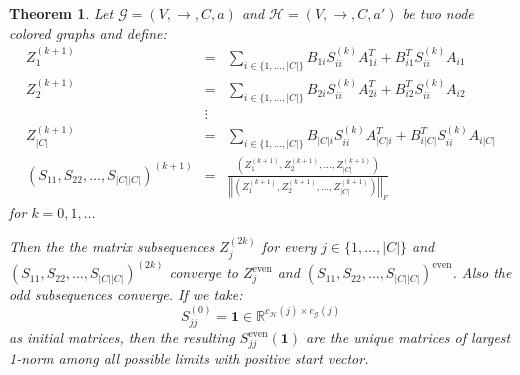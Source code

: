 \documentclass[a4paper,11pt]{report}
\newtheorem{theorem}{Theorem}[section]
\newcommand{\R}{{\mathbb R}}
\newcommand{\graf}{\mathscr{G}}
\newcommand{\grafeen}{\mathscr{H}}
\begin{document}
\begin{theorem}
  Let $\graf=(V,\to, C, a)$ and $\grafeen=(V,\to, C, a')$ be two node colored graphs and define:
  \begin{eqnarray*}
  Z^{(k+1)}_1 &=& \sum_{i \in \{1,\ldots, |C|\}}B_{1i}S^{(k)}_{ii}A^T_{1i} + B^T_{i1}S^{(k)}_{ii}A_{i1}\\
  Z^{(k+1)}_2 &=& \sum_{i \in \{1,\ldots, |C|\}}B_{2i}S^{(k)}_{ii}A^T_{2i} + B^T_{i2}S^{(k)}_{ii}A_{i2} \\
  &\vdots& \\
    Z^{(k+1)}_{|C|} &=& \sum_{i \in \{1,\ldots, |C|\}}B_{|C|i}S^{(k)}_{ii}A^T_{|C|i} + B^T_{i|C|}S^{(k)}_{ii}A_{i|C|} \\
 (S_{11}, S_{22},\ldots, S_{|C| |C|} )^{(k+1)} &=& \frac{\left(Z^{(k+1)}_1, Z^{(k+1)}_2, \ldots,Z^{(k+1)}_{|C|}\right)}{\left|\left|\left(Z^{(k+1)}_1, Z^{(k+1)}_2, \ldots,Z^{(k+1)}_{|C|}\right)\right|\right|_F}
  \end{eqnarray*}
 for $k = 0,1,\ldots$

 Then the the matrix subsequences $Z^{(2k)}_j$ for every $j \in \{1, \ldots, |C|\}$ 
 and $(S_{11}, S_{22},\ldots, S_{|C| |C|} )^{(2k)}$ converge to $Z^{\text{even}}_j$ and  $(S_{11}, S_{22},\ldots, S_{|C| |C|} 
 )^{\text{even}}$. Also the odd subsequences converge. If we take:
 $$S^{(0)}_{jj} = \mathbf{1} \in \R^{c_\grafeen(j)\times c_\graf(j)}$$
 as initial matrices, then the resulting $S^{\text{even}}_{jj}(\mathbf{1})$ are 
 the unique matrices of largest 1-norm among all possible limits with positive 
 start vector.
  
\end{theorem}
  
\end{document}
